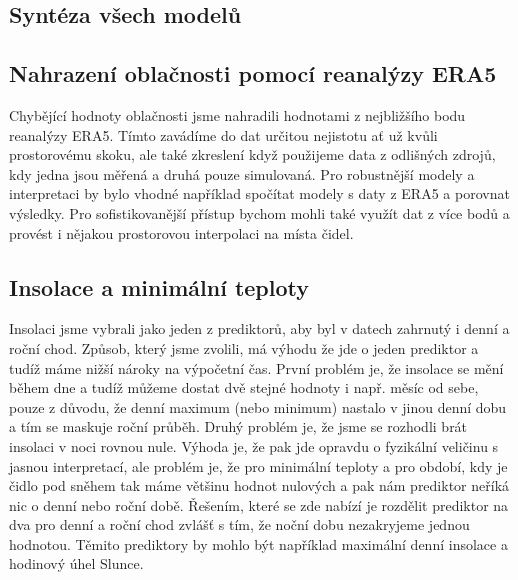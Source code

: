 \subsection{Syntéza všech modelů}

\subsection{Nahrazení oblačnosti pomocí reanalýzy ERA5}
Chybějící hodnoty oblačnosti jsme nahradili hodnotami z nejbližšího bodu reanalýzy ERA5. Tímto zavádíme do dat určitou nejistotu ať už kvůli prostorovému skoku, ale také zkreslení když použijeme data z odlišných zdrojů, kdy jedna jsou měřená a druhá pouze simulovaná. Pro robustnější modely a interpretaci by bylo vhodné například spočítat modely s daty z ERA5 a porovnat výsledky. Pro sofistikovanější přístup bychom mohli také využít dat z více bodů a provést i nějakou prostorovou interpolaci na místa čidel.

\subsection{Insolace a minimální teploty}\label{chap:mintemp_insolation}
Insolaci jsme vybrali jako jeden z prediktorů, aby byl v datech zahrnutý i denní a roční chod. Způsob, který jsme zvolili, má výhodu že jde o jeden prediktor a tudíž máme nižší nároky na výpočetní čas. První problém je, že insolace se mění během dne a tudíž můžeme dostat dvě stejné hodnoty i např. měsíc od sebe, pouze z důvodu, že denní maximum (nebo minimum) nastalo v jinou denní dobu a tím se maskuje roční průběh. Druhý problém je, že jsme se rozhodli brát insolaci v noci rovnou nule. Výhoda je, že pak jde opravdu o fyzikální veličinu s jasnou interpretací, ale problém je, že pro minimální teploty a pro období, kdy je čidlo pod sněhem tak máme většinu hodnot nulových a pak nám prediktor neříká nic o denní nebo roční době. Řešením, které se zde nabízí je rozdělit prediktor na dva pro denní a roční chod zvlášť s tím, že noční dobu nezakryjeme jednou hodnotou. Těmito prediktory by mohlo být například maximální denní insolace a hodinový úhel Slunce.

